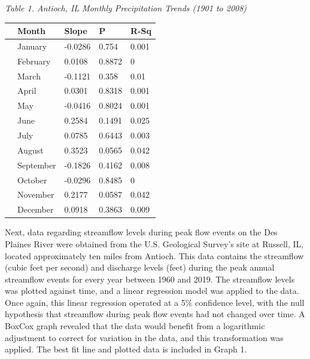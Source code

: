 \documentclass{article}\usepackage[]{graphicx}\usepackage[]{color}
\begin{document}
\emph{Table 1. Antioch, IL Monthly Precipitation Trends (1901 to 2008)}
\begin{table}[ht]
\centering
\begin{tabular}{rllll}
  \hline
 & Month & Slope & P & R-Sq \\ 
  \hline
  & January & -0.0286 & 0.754 & 0.001 \\ 
  & February & 0.0108 & 0.8872 & 0 \\ 
  & March & -0.1121 & 0.358 & 0.01 \\ 
  & April & 0.0301 & 0.8318 & 0.001 \\ 
  & May & -0.0416 & 0.8024 & 0.001 \\ 
  & June & 0.2584 & 0.1491 & 0.025 \\ 
  & July & 0.0785 & 0.6443 & 0.003 \\ 
  & August & 0.3523 & 0.0565 & 0.042 \\ 
  & September & -0.1826 & 0.4162 & 0.008 \\ 
  & October & -0.0296 & 0.8485 & 0 \\ 
  & November & 0.2177 & 0.0587 & 0.042 \\ 
  & December & 0.0918 & 0.3863 & 0.009 \\ 
   \hline
\end{tabular}
\end{table}
\newpage

Next, data regarding streamflow levels during peak flow events on the Des Plaines River were obtained from the U.S. Geological Survey's site at Russell, IL, located approximately ten miles from Antioch.  This data contains the streamflow (cubic feet per second) and discharge levels (feet) during the peak annual streamflow events for every year between 1960 and 2019.  The streamflow levels was plotted against time, and a linear regression model was applied to the data.  Once again, this linear regression operated at a 5\% confidence level, with the null hypothesis that streamflow during peak flow events had not changed over time.  A BoxCox graph revealed that the data would benefit from a logarithmic adjustment to correct for variation in the data, and this transformation was applied.  The best fit line and plotted data is included in Graph 1.
\end{document}
